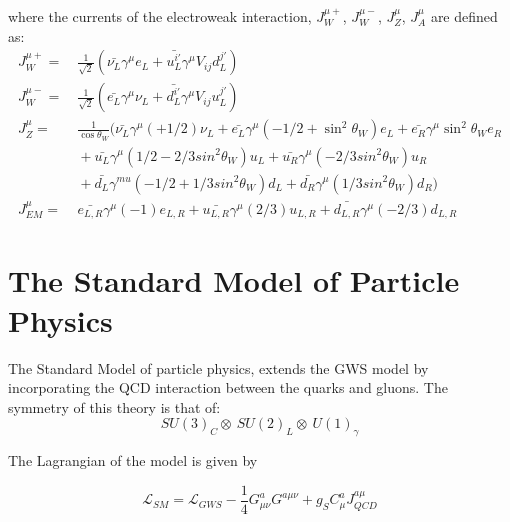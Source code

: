 \noindent where the currents of the electroweak interaction,
$J_{W}^{\mu+}$, $J_{W}^{\mu-}$, $J_{Z}^{\mu}$, $J_{A}^{\mu}$ are
defined as:
\begin{equation}\label{eq:ewk_currents}
\begin{aligned}
J_{W}^{\mu+} =&~ \frac{1}{\sqrt{2}}\left(
  \bar{\nu_{L}}\gamma^{\mu}e_{L} + \bar{u_{L}^{i\prime}}\gamma^{\mu}V_{ij}d_{L}^{j\prime}
\right) \\ 
J_{W}^{\mu-} =&~ \frac{1}{\sqrt{2}}\left(
  \bar{e_{L}}\gamma^{\mu}\nu_{L} +
    \bar{d_{L}^{i\prime}}\gamma^{\mu}V_{ij}u_{L}^{j\prime} \right) \\
J_{Z}^{\mu} =&~ \frac{1}{\cos{\theta_{W}}}(
  \bar{\nu_{L}}\gamma^{\mu}(+1/2)\nu_{L} +
  \bar{e_{L}}\gamma^{\mu}(-1/2+\sin^{2}{\theta_{W}})e_{L} +
  \bar{e_{R}}\gamma^{\mu}\sin^{2}{\theta_{W}}e_{R} \\
&~ + \bar{u_{L}}\gamma^{\mu}(1/2-2/3sin^{2}{\theta_{W}})u_{L} +
\bar{u_{R}}\gamma^{\mu}(-2/3sin^{2}{\theta_{W}})u_{R} \\
&~ + \bar{d_{L}}\gamma^{mu}(-1/2+1/3sin^{2}{\theta_{W}})d_{L} +
\bar{d_{R}}\gamma^{\mu}(1/3sin^{2}{\theta_{W}})d_{R} ) \\
J_{EM}^{\mu} =&~ \bar{e_{L,R}}\gamma^{\mu}(-1)e_{L,R} +
\bar{u_{L,R}}\gamma^{\mu}(2/3)u_{L,R} + \bar{d_{L,R}}\gamma^{\mu}(-2/3)d_{L,R}
\end{aligned}
\end{equation}



\section{The Standard Model of Particle Physics}
\label{standard_model_overview}

\par The Standard Model of particle physics, extends the GWS model by
incorporating the QCD interaction between the quarks and gluons.  The
symmetry of this theory is that of:
\begin{equation}\label{eq:sm_symmetry}
SU(3)_{C}\otimes~SU(2)_{L}\otimes~U(1)_{\gamma}
\end{equation}

\noindent The Lagrangian of the model is given by 

\begin{equation}\label{eq:sm_lagrangian}
\mathcal{L}_{SM} = \mathcal{L}_{GWS} -
\frac{1}{4}G_{\mu\nu}^{a}G^{a\mu\nu} + g_{S}C_{\mu}^{a}J_{QCD}^{a\mu}
\end{equation}

